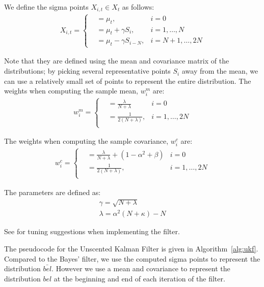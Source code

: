 \documentclass{article}
\begin{document}
We define the sigma points $X_{i,t} \in X_t$ as follows:
\begin{align}
  X_{i,t} = \left\{  \begin{array}{lll}
    &= \mu_t,              & i=0\\
    &= \mu_t + \gamma S_i, & i=1,\dots,N\\
    &= \mu_t - \gamma S_{i-N}, & i=N+1,\dots,2N
  \end{array}
  \right.
  \label{eq:sigma}
\end{align}

Note that they are defined using the mean and covariance matrix of the
distributions; by picking several representative points $S_i$ away
from the mean, we can use a relatively small set of points to
represent the entire distribution.  The weights when computing the
sample mean, $w_i^m$ are:
\begin{align}
  w_i^m = \left\{  \begin{array}{lll}
  &= \frac{\lambda}{N + \lambda}            & i=0\\
  &= \frac{1}{2(N + \lambda)},              & i=1,\dots,2N\\
  \end{array}
  \right.
  \label{eq:weights}
\end{align}

The weights when computing the sample covariance, $w_i^c$ are:
\begin{align}
  w_i^c = \left\{  \begin{array}{lll}
  &= \frac{\lambda}{N + \lambda} + (1 - \alpha^2 + \beta)            & i=0\\
  &= \frac{1}{2(N + \lambda)},              & i=1,\dots,2N\\
  \end{array}
  \right.
  \label{eq:covweights}
\end{align}


The parameters are defined as: 
\begin{align}
  \gamma = \sqrt{N + \lambda}\\
  \lambda = \alpha^2(N + \kappa) - N
\end{align}


See \citet{kandepu2008applying} for tuning suggestions when
implementing the filter.

The pseudocode for the Unscented Kalman Filter is given in
Algorithm~\ref{alg:ukf}.  Compared to the Bayes' filter, we use the
computed sigma points to represent the distribution $\bar{bel}$.
However we use a mean and covariance to represent the distribution
$bel$ at the beginning and end of each iteration of the filter.
\end{document}
